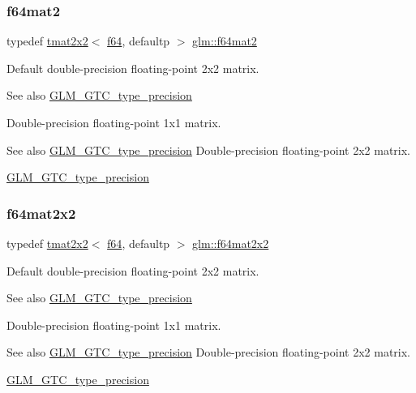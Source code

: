 \subsubsection{\texorpdfstring{f64mat2}{f64mat2}}
{\footnotesize\ttfamily typedef \hyperlink{structglm_1_1tmat2x2}{tmat2x2}$<$ \hyperlink{group__gtc__type__precision_ga2bba392e555124b36cde6abba349bab3}{f64}, defaultp $>$ \hyperlink{group__gtc__type__precision_gaf66aa8b74ef627da80162c17a74a04fe}{glm\+::f64mat2}}

Default double-\/precision floating-\/point 2x2 matrix. \begin{DoxySeeAlso}{See also}
\hyperlink{group__gtc__type__precision}{G\+L\+M\+\_\+\+G\+T\+C\+\_\+type\+\_\+precision}
\end{DoxySeeAlso}
Double-\/precision floating-\/point 1x1 matrix. \begin{DoxySeeAlso}{See also}
\hyperlink{group__gtc__type__precision}{G\+L\+M\+\_\+\+G\+T\+C\+\_\+type\+\_\+precision} Double-\/precision floating-\/point 2x2 matrix. 

\hyperlink{group__gtc__type__precision}{G\+L\+M\+\_\+\+G\+T\+C\+\_\+type\+\_\+precision} 
\end{DoxySeeAlso}
\mbox{\label{group__gtc__type__precision_ga1e14d8b4e18898be51cd719fda213dcc}} 
\subsubsection{\texorpdfstring{f64mat2x2}{f64mat2x2}}
{\footnotesize\ttfamily typedef \hyperlink{structglm_1_1tmat2x2}{tmat2x2}$<$ \hyperlink{group__gtc__type__precision_ga2bba392e555124b36cde6abba349bab3}{f64}, defaultp $>$ \hyperlink{group__gtc__type__precision_ga1e14d8b4e18898be51cd719fda213dcc}{glm\+::f64mat2x2}}

Default double-\/precision floating-\/point 2x2 matrix. \begin{DoxySeeAlso}{See also}
\hyperlink{group__gtc__type__precision}{G\+L\+M\+\_\+\+G\+T\+C\+\_\+type\+\_\+precision}
\end{DoxySeeAlso}
Double-\/precision floating-\/point 1x1 matrix. \begin{DoxySeeAlso}{See also}
\hyperlink{group__gtc__type__precision}{G\+L\+M\+\_\+\+G\+T\+C\+\_\+type\+\_\+precision} Double-\/precision floating-\/point 2x2 matrix. 

\hyperlink{group__gtc__type__precision}{G\+L\+M\+\_\+\+G\+T\+C\+\_\+type\+\_\+precision} 
\end{DoxySeeAlso}
\mbox{\label{group__gtc__type__precision_ga6d0196bded514d55e26e0f68dd38b37b}} 
